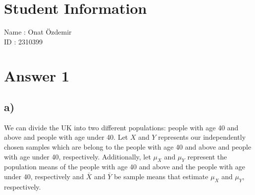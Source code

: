 \documentclass[12pt]{article}
\begin{document}
\section*{Student Information}

Name : Onat Özdemir\\

ID : 2310399\\



\section*{Answer 1}
\subsection*{a)} We can divide the UK into two different populations: people with age 40 and above and people with age under 40. Let $X$ and $Y$ represents our independently chosen samples which are belong to the people with age 40 and above and people with age under 40, respectively. Additionally, let $\mu_{X}$ and $\mu_{Y}$ represent the population means of the people with age 40 and above and the people with age under 40, respectively and $\bar{X}$ and $\bar{Y}$ be sample means that estimate $\mu_{X}$ and $\mu_{Y}$, respectively.\\
\end{document}

